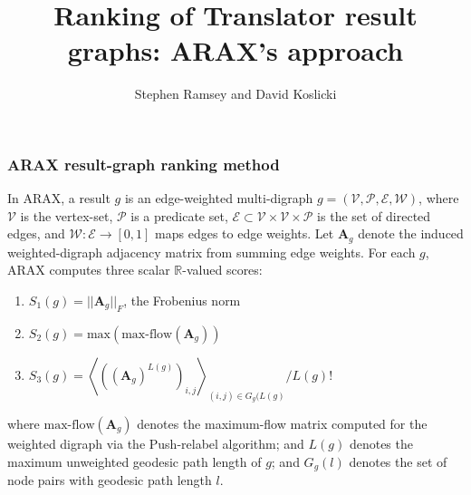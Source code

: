 \documentclass{beamer}
\title{Ranking of Translator result graphs: ARAX's approach}
\author{Stephen Ramsey and David Koslicki}
\institute{Team Expander Agent}
\begin{document}
\frame{\titlepage}
\begin{frame}
  \frametitle{ARAX result-graph ranking method} In ARAX, a result $g$ is an
  edge-weighted multi-digraph $g = ({\mathcal V}, {\mathcal P}, {\mathcal E},
  {\mathcal W})$, where ${\mathcal V}$ is the vertex-set, ${\mathcal P}$ is a
  predicate set, ${\mathcal E} \subset {\mathcal V} \times {\mathcal V} \times
  {\mathcal P}$ is the set of directed edges, and ${\mathcal W}: {\mathcal E}
  \rightarrow [0,1]$ maps edges to edge weights.  Let $\boldsymbol{A}_g$ denote
  the induced weighted-digraph adjacency matrix from summing edge weights.  For
  each $g$, ARAX computes three scalar $\mathbb{R}$-valued scores:
  \begin{enumerate}
  \item $S_1(g) = ||\boldsymbol{A}_g||_F$, the Frobenius norm
  \item $S_2(g) = \textrm{max}\left( \textrm{max-flow}(\boldsymbol{A}_g) \right)$
  \item $S_3(g) = \left\langle ((\boldsymbol{A}_g)^{L(g)})_{i,j}\right\rangle_{(i,j) \in G_g(L(g)}/L(g)!$
  \end{enumerate}
  where $\textrm{max-flow}(\boldsymbol{A}_g)$ denotes the maximum-flow matrix
  computed for the weighted digraph via the Push-relabel algorithm; and $L(g)$ denotes
  the maximum unweighted geodesic path length of $g$; and
  $G_g(l)$ denotes the set of node pairs with geodesic path length $l$.
\end{frame}
\end{document}
